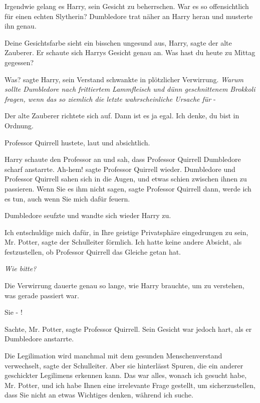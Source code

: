 Irgendwie gelang es Harry, sein Gesicht zu beherrschen. War es so offensichtlich
für einen echten Slytherin? Dumbledore trat näher an Harry heran und musterte
ihn genau.

\glqq{}Deine Gesichtsfarbe sieht ein bisschen ungesund aus, Harry\grqq{}, sagte
der alte Zauberer. Er schaute sich Harrys Gesicht genau an. \glqq{}Was hast du
heute zu Mittag gegessen?\grqq{}

\glqq{}Was?\grqq{} sagte Harry, sein Verstand schwankte in plötzlicher
Verwirrung. \emph{Warum sollte Dumbledore nach frittiertem Lammfleisch und dünn
geschnittenem Brokkoli fragen, wenn das so ziemlich die letzte wahrscheinliche
Ursache für} -

Der alte Zauberer richtete sich auf. \glqq{}Dann ist es ja egal. Ich denke, du
bist in Ordnung.\grqq{}

Professor Quirrell hustete, laut und absichtlich.

Harry schaute den Professor an und sah, dass Professor Quirrell Dumbledore
scharf anstarrte. \glqq{}Ah-hem!\grqq{} sagte Professor Quirrell wieder.
Dumbledore und Professor Quirrell sahen sich in die Augen, und etwas schien
zwischen ihnen zu passieren. \glqq{}Wenn Sie es ihm nicht sagen\grqq{}, sagte
Professor Quirrell dann, \glqq{}werde ich es tun, auch wenn Sie mich dafür
feuern.\grqq{}

Dumbledore seufzte und wandte sich wieder Harry zu.

\glqq{}Ich entschuldige mich dafür, in Ihre geistige Privatsphäre eingedrungen zu
sein, Mr. Potter\grqq{}, sagte der Schulleiter förmlich. \glqq{}Ich hatte keine
andere Absicht, als festzustellen, ob Professor Quirrell das Gleiche getan
hat.\grqq{}

\emph{Wie bitte?}

Die Verwirrung dauerte genau so lange, wie Harry brauchte, um zu verstehen, was
gerade passiert war.

\glqq{}Sie - !\grqq{}

\glqq{}Sachte, Mr. Potter\grqq{}, sagte Professor Quirrell. Sein Gesicht war
jedoch hart, als er Dumbledore anstarrte.

\glqq{}Die Legilimation wird manchmal mit dem gesunden Menschenverstand
verwechselt\grqq{}, sagte der Schulleiter. \glqq{}Aber sie hinterlässt Spuren,
die ein anderer geschickter Legilimens erkennen kann. Das war alles, wonach ich
gesucht habe, Mr. Potter, und ich habe Ihnen eine irrelevante Frage gestellt, um
sicherzustellen, dass Sie nicht an etwas Wichtiges denken, während ich
suche.\grqq{}

